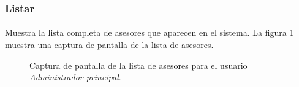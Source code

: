 \subsubsection{Listar}

  \paragraph{}Muestra la lista completa de asesores que aparecen en el sistema.
  La figura \ref{capturaPantallaListaAsesoresAdminPrincipal} muestra una
  captura de pantalla de la lista de asesores.

  \begin{figure}[!ht]
    \begin{center}
      \caption{Captura de pantalla de la lista de asesores para el usuario \textit{Administrador principal}.}
      \label{capturaPantallaListaAsesoresAdminPrincipal}
    \end{center}
  \end{figure}
